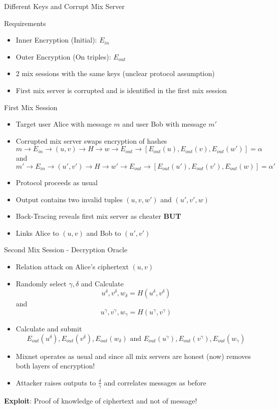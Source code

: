 \documentclass{beamer}
\begin{document}
\begin{frame}[allowframebreaks]{Different Keys and Corrupt Mix Server}
\begin{block}{Requirements}
\begin{itemize}
\item Inner Encryption (Initial): $E_{in}$
\item Outer Encryption (On triples): $E_{out}$
\item 2 mix sessions with the same keys (unclear protocol assumption)
\item First mix server is corrupted and is identified in the first mix session
\end{itemize}
\end{block}
\begin{block}{First Mix Session}
\begin{itemize}
\item Target user Alice with message $m$ and user Bob with message $m'$
\item Corrupted mix server swaps encryption of hashes 
\[ m \rightarrow E_{in} \rightarrow (u,v) \rightarrow H \rightarrow w \rightarrow E_{out} \rightarrow [E_{out}(u),E_{out}(v),E_{out}(w')]=\alpha \]
and
\[ m' \rightarrow E_{in} \rightarrow (u',v') \rightarrow H \rightarrow w' \rightarrow E_{out} \rightarrow [E_{out}(u'),E_{out}(v'),E_{out}(w)]=\alpha' \]
\item Protocol proceeds as usual
\item Output contains two invalid tuples $(u,v,w')$ and $(u',v',w)$
\item Back-Tracing reveals first mix server as cheater \textbf{BUT}
\item Links Alice to $(u,v)$ and Bob to $(u',v')$
\end{itemize}
\end{block}

\begin{block}{Second Mix Session - Decryption Oracle}
\begin{itemize}
\item Relation attack on Alice's ciphertext $(u,v)$
\item Randomly select $\gamma,\delta$
and Calculate 
	  \small \[ u^\delta,v^\delta,w_\delta=H(u^\delta,v^\delta) \] \normalsize
	  and 
	  \small \[ u^\gamma,v^\gamma,w_\gamma=H(u^\gamma,v^\gamma) \] \normalsize
\item Calculate and submit 
	  \small \[ E_{out}(u^\delta),E_{out}(v^\delta),E_{out}(w_\delta)  \text{ and } E_{out}(u^\gamma),E_{out}(v^\gamma),E_{out}(w_\gamma) \] \normalsize
\item Mixnet operates as usual and since all mix servers are honest (now) removes both layers of encryption!
\item Attacker raises outputs to $\frac{\delta}{\gamma}$ and correlates messages as before
\end{itemize}
\textbf{Exploit}: Proof of knowledge of ciphertext and not of message!
\end{block}
\end{frame}
\end{document}
